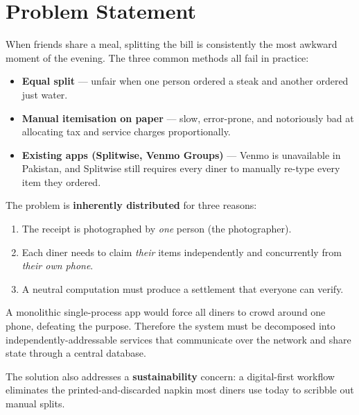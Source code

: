 \documentclass[11pt, a4paper]{article}
\begin{document}
\tableofcontents
\thispagestyle{fancy}
\newpage

\section{Problem Statement}
\label{sec:problem}

When friends share a meal, splitting the bill is consistently the most awkward moment of the evening. The three common methods all fail in practice:

\begin{itemize}[leftmargin=*]
\item \textbf{Equal split} --- unfair when one person ordered a steak and another ordered just water.
\item \textbf{Manual itemisation on paper} --- slow, error-prone, and notoriously bad at allocating tax and service charges proportionally.
\item \textbf{Existing apps (Splitwise, Venmo Groups)} --- Venmo is unavailable in Pakistan, and Splitwise still requires every diner to manually re-type every item they ordered.
\end{itemize}

The problem is \textbf{inherently distributed} for three reasons:
\begin{enumerate}[leftmargin=*]
\item The receipt is photographed by \textit{one} person (the photographer).
\item Each diner needs to claim \textit{their} items independently and concurrently from \textit{their own phone}.
\item A neutral computation must produce a settlement that everyone can verify.
\end{enumerate}

A monolithic single-process app would force all diners to crowd around one phone, defeating the purpose. Therefore the system must be decomposed into independently-addressable services that communicate over the network and share state through a central database.

The solution also addresses a \textbf{sustainability} concern: a digital-first workflow eliminates the printed-and-discarded napkin most diners use today to scribble out manual splits.

\end{document}
